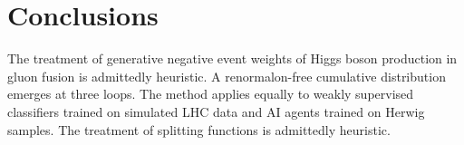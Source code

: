 \section{Conclusions}\label{sec:conclusions}

The treatment of generative negative event weights of Higgs boson
production in gluon fusion is admittedly heuristic. A renormalon-free
cumulative distribution emerges at three loops. The method applies
equally to weakly supervised classifiers trained on simulated LHC data
and AI agents trained on Herwig samples. The treatment of splitting
functions is admittedly heuristic.

